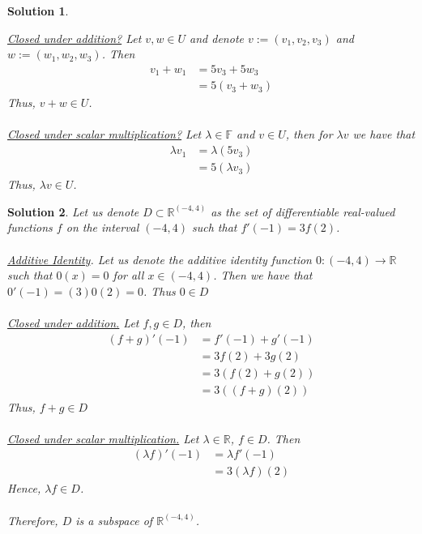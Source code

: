 \documentclass[12pt]{article}
\newcommand{\R}{\mathbb{R}}
\newcommand{\F}{\mathbb{F}}
\theoremstyle{problem}
\newtheorem{sol}{Solution}
\theoremstyle{remark}
\begin{document}
\begin{sol}
\begin{enumerate}
    \textit{\underline{Closed under addition?}} Let $v, w \in U$ and denote $v := (v_1,v_2,v_3)$ and $w := (w_1, w_2, w_3)$. Then 
    \begin{align*}
        v_1 + w_1 &= 5v_3 + 5w_3 \\
       &= 5( v_3 + w_3)
    \end{align*}
    Thus, $v + w  \in U$. \\ \\
    \textit{\underline{Closed under scalar multiplication?}} 
    Let $\lambda \in \F$ and $v \in U$, then for $\lambda v$ we have that 
    \begin{align*}
        \lambda v_1  &= \lambda(5v_3) \\
        &= 5(\lambda v_3)
    \end{align*}
    Thus, $\lambda v \in U$.
\end{enumerate}
\end{sol}
\begin{sol}
    Let us denote $D \subset \R^{(-4,4)}$ as the set of differentiable real-valued functions $f$ on the interval $(-4,4)$ such that $f'(-1) = 3f(2)$.\\ \\
    \textit{\underline{Additive Identity}}. Let us denote the additive identity function $0: (-4,4) \to \R$ such that $0(x) = 0$ for all $x \in (-4,4)$. Then we have that $0'(-1) = (3)0(2) = 0$. Thus $0 \in D$ \\ \\
    \textit{\underline{Closed under addition.}} Let $f,g \in D$, then 
    \begin{align*}
        (f+g)'(-1) &= f'(-1) + g'(-1) \\
        &= 3f(2) + 3g(2) \\
        &= 3(f(2) + g(2)) \\ 
        &= 3((f+g)(2))
    \end{align*}
    Thus, $f +g \in D$ \\ \\
    \textit{\underline{Closed under scalar multiplication.}} Let $\lambda \in \R$, $f \in D$. Then 
    \begin{align*}
        (\lambda f)'(-1) &= \lambda f'(-1) \\ &= 3(\lambda f)(2)
    \end{align*}
    Hence, $\lambda f \in D$. \\ \\
    Therefore, $D$ is a subspace of $\R^{(-4,4)}$.
\end{sol}
\end{document}

